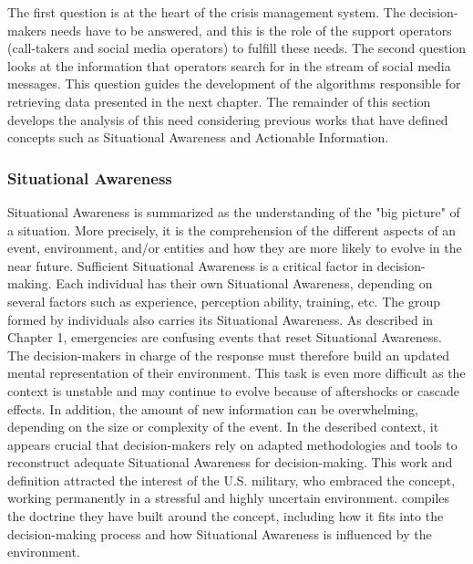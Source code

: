 The first question is at the heart of the crisis management system.
The decision-makers needs have to be answered, and this is the role of the support operators (call-takers and social media operators) to fulfill these needs.
The second question looks at the information that operators search for in the stream of social media messages.
This question guides the development of the algorithms responsible for retrieving data presented in the next chapter.
The remainder of this section develops the analysis of this need considering previous works that have defined concepts such as Situational Awareness and Actionable Information.

\subsubsection{Situational Awareness}
\label{sec:situational-awareness}
Situational Awareness is summarized as the understanding of the "big picture" of a situation.
More precisely, it is the comprehension of the different aspects of an event, environment, and/or entities and how they are more likely to evolve in the near future.
Sufficient Situational Awareness is a critical factor in decision-making.
Each individual has their own Situational Awareness, depending on several factors such as experience, perception ability, training, etc.
The group formed by individuals also carries its Situational Awareness.
As described in Chapter 1, emergencies are confusing events that reset Situational Awareness.
The decision-makers in charge of the response must therefore build an updated mental representation of their environment.
This task is even more difficult as the context is unstable and may continue to evolve because of aftershocks or cascade effects.
In addition, the amount of new information can be overwhelming, depending on the size or complexity of the event.
In the described context, it appears crucial that decision-makers rely on adapted methodologies and tools to reconstruct adequate Situational Awareness for decision-making.
This work and definition attracted the interest of the U.S. military, who embraced the concept, working permanently in a stressful and highly uncertain environment.
\textcite{departmentofthearmyAdvancedSituationalAwareness2021} compiles the doctrine they have built around the concept, including how it fits into the decision-making process and how Situational Awareness is influenced by the environment.


